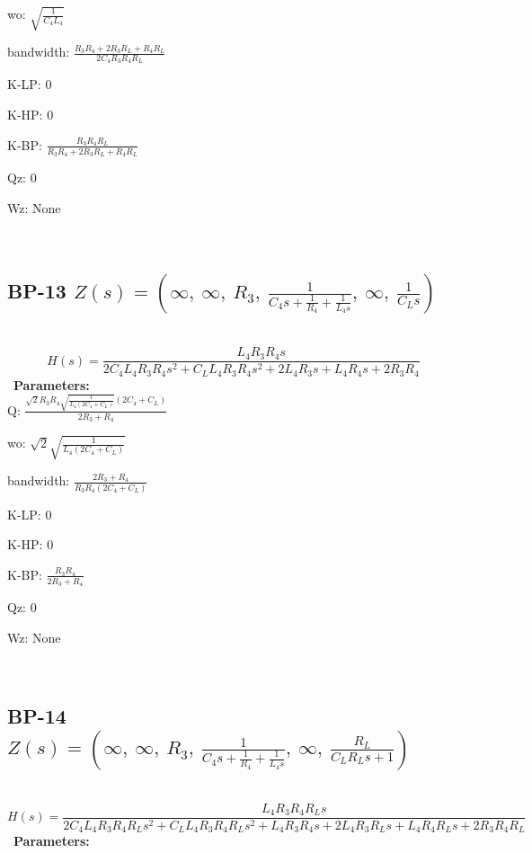 \documentclass{article}
\begin{document}
wo: $\sqrt{\frac{1}{C_{4} L_{4}}}$\ 

bandwidth: $\frac{R_{3} R_{4} + 2 R_{3} R_{L} + R_{4} R_{L}}{2 C_{4} R_{3} R_{4} R_{L}}$\ 

K-LP: $0$\ 

K-HP: $0$\ 

K-BP: $\frac{R_{3} R_{4} R_{L}}{R_{3} R_{4} + 2 R_{3} R_{L} + R_{4} R_{L}}$\ 

Qz: $0$\ 

Wz: $\text{None}$\ 

\ 

\subsection{BP-13 $Z(s) = \left( \infty, \  \infty, \  R_{3}, \  \frac{1}{C_{4} s + \frac{1}{R_{4}} + \frac{1}{L_{4} s}}, \  \infty, \  \frac{1}{C_{L} s}\right)$ } \ 
\textbf{\[H(s) = \frac{L_{4} R_{3} R_{4} s}{2 C_{4} L_{4} R_{3} R_{4} s^{2} + C_{L} L_{4} R_{3} R_{4} s^{2} + 2 L_{4} R_{3} s + L_{4} R_{4} s + 2 R_{3} R_{4}}\] } \ 
\textbf{Parameters:}\\ 

Q: $\frac{\sqrt{2} R_{3} R_{4} \sqrt{\frac{1}{L_{4} \left(2 C_{4} + C_{L}\right)}} \left(2 C_{4} + C_{L}\right)}{2 R_{3} + R_{4}}$\ 

wo: $\sqrt{2} \sqrt{\frac{1}{L_{4} \left(2 C_{4} + C_{L}\right)}}$\ 

bandwidth: $\frac{2 R_{3} + R_{4}}{R_{3} R_{4} \left(2 C_{4} + C_{L}\right)}$\ 

K-LP: $0$\ 

K-HP: $0$\ 

K-BP: $\frac{R_{3} R_{4}}{2 R_{3} + R_{4}}$\ 

Qz: $0$\ 

Wz: $\text{None}$\ 

\ 

\subsection{BP-14 $Z(s) = \left( \infty, \  \infty, \  R_{3}, \  \frac{1}{C_{4} s + \frac{1}{R_{4}} + \frac{1}{L_{4} s}}, \  \infty, \  \frac{R_{L}}{C_{L} R_{L} s + 1}\right)$ } \ 
\textbf{\[H(s) = \frac{L_{4} R_{3} R_{4} R_{L} s}{2 C_{4} L_{4} R_{3} R_{4} R_{L} s^{2} + C_{L} L_{4} R_{3} R_{4} R_{L} s^{2} + L_{4} R_{3} R_{4} s + 2 L_{4} R_{3} R_{L} s + L_{4} R_{4} R_{L} s + 2 R_{3} R_{4} R_{L}}\] } \ 
\textbf{Parameters:}\\ 
\end{document}

